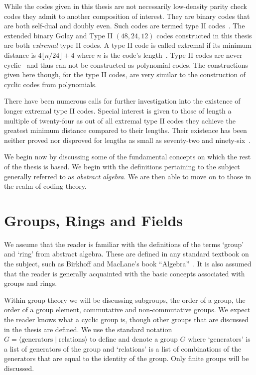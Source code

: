 While the codes given in this thesis are not necessarily low-density parity check codes they admit to another composition of interest.
They are binary codes that are both self-dual and doubly even.
Such codes are termed type II codes~\cite[p.~96]{han98a}.
The extended binary Golay and Type II $(48,24,12)$ codes constructed in this thesis are both \emph{extremal} type II codes.
A type II code is called extremal if its minimum distance is $4 \lfloor n / 24 \rfloor + 4$ where $n$ is the code's length~\cite[p.~270]{han98a}.
Type II codes are never cyclic~\cite{slo83} and thus can not be constructed as polynomial codes.
The constructions given here though, for the type II codes, are very similar to the construction of cyclic codes from polynomials.

There have been numerous calls for further investigation into the existence of longer extremal type II codes.
Special interest is given to those of length a multiple of twenty-four as out of all extremal type II codes they achieve the greatest minimum distance compared to their lengths.
Their existence has been neither proved nor disproved for lengths as small as seventy-two and ninety-six~\cite{kim08}.

We begin now by discussing some of the fundamental concepts on which the rest of the thesis is based.
We begin with the definitions pertaining to the subject generally referred to as \emph{abstract algebra}.
We are then able to move on to those in the realm of coding theory.


\section{Groups, Rings and Fields}
We assume that the reader is familiar with the definitions of the terms `group' and `ring' from abstract algebra.
These are defined in any standard textbook on the subject, such as Birkhoff and MacLane's book ``Algebra''~\cite[p.~43]{mac99}.
It is also assumed that the reader is generally acquainted with the basic concepts associated with groups and rings.

Within group theory we will be discussing subgroups, the order of a group, the order of a group element, commutative and non-commutative groups.
We expect the reader knows what a cyclic group is, though other groups that are discussed in the thesis are defined.
We use the standard notation $G = \langle \textrm{generators} \mid \textrm{relations} \rangle$ to define and denote a group $G$ where `generators' is a list of generators of the group and `relations' is a list of combinations of the generators that are equal to the identity of the group.
Only finite groups will be discussed.

